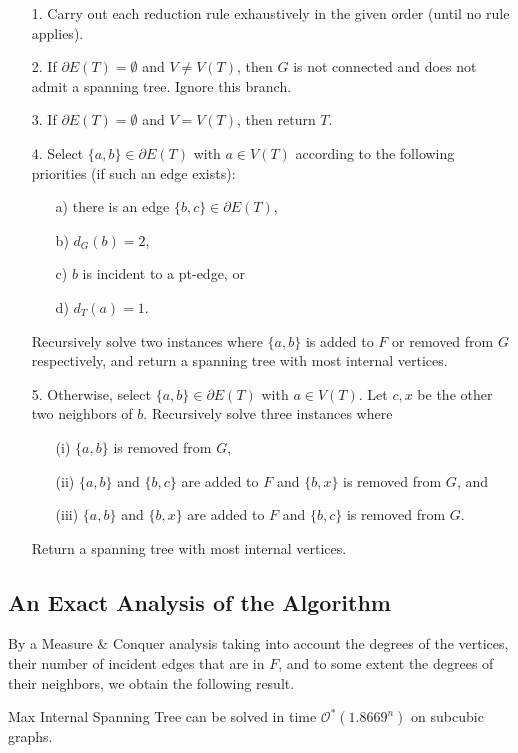 \documentclass{llncs}
\newcommand{\longversion}[1]{#1}
\newcommand{\mc}{\mathcal}
\newcommand{\Oh}{{\mc{O}}}
\newcommand{\rt}{1.8669}
\begin{document}
\begin{enumerate}
 \item[1.] Carry out each reduction rule exhaustively in the given order (until no rule applies).
 \item[2.] If $\partial E(T)=\emptyset$ and $V \neq V(T)$, then $G$ is not connected and does not admit a spanning tree. Ignore this branch.
 \item[3.] If $\partial E(T)=\emptyset$ and $V = V(T)$, then return $T$.
 \item[4.] Select $\{a,b\} \in \partial E(T)$ with $a \in V(T)$ according to the following priorities (if such an edge exists):
  \begin{itemize}
   \item[a)] there is an edge $\{b,c\} \in \partial E(T)$,
   \item[b)] $d_G(b)=2$,
   \item[c)] $b$ is incident to a pt-edge, or
   \item[d)] $d_T(a)=1$.
  \end{itemize}
  Recursively solve two instances where $\{a,b\}$ is added to $F$ or removed from $G$ respectively, and return a spanning tree with most internal vertices.
 \item[5.] Otherwise, select $\{a,b\} \in \partial E(T)$ with $a \in V(T)$. Let $c,x$ be the other two neighbors of $b$. Recursively solve three instances where 
  \begin{itemize}
   \item[(i)] $\{a,b\}$ is removed from $G$,
   \item[(ii)] $\{a,b\}$ and $\{b,c\}$ are added to $F$ and $\{b,x\}$ is removed from $G$, and
   \item[(iii)] $\{a,b\}$ and $\{b,x\}$ are added to $F$ and $\{b,c\}$ is removed from $G$.
  \end{itemize}
  Return a spanning tree with most internal vertices.
\end{enumerate}

\longversion{\subsection{An Exact Analysis of the Algorithm}}

By a Measure \& Conquer analysis taking into account the degrees of the vertices, their number of incident edges that are in $F$, and to some extent
the degrees of their neighbors, 
we obtain the following result.

\begin{theorem}\label{thm:exalg}
{\sc Max Internal Spanning Tree} can be solved in time $\Oh^*(\rt^n)$ on subcubic graphs.
\end{theorem}
\end{document}
